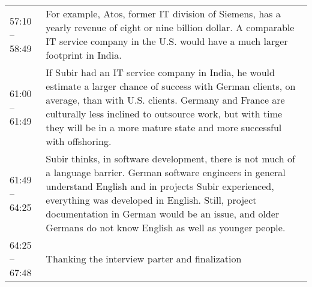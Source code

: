 \begin{appendix}
\begin{longtable}{l p{12.5cm}}
	57:10 -- 58:49&For example, Atos, former IT division of Siemens, has a yearly revenue of eight or nine billion dollar. A comparable IT service company in the U.S. would have a much larger footprint in India.\\
	61:00 -- 61:49&If Subir had an IT service company in India, he would estimate a larger chance of success with German clients, on average, than with U.S. clients. Germany and France are culturally less inclined to outsource work, but with time they will be in a more mature state and more successful with offshoring.\\
	61:49 -- 64:25&Subir thinks, in software development, there is not much of a language barrier. German software engineers in general understand English and in projects Subir experienced, everything was developed in English. Still, project documentation in German would be an issue, and older Germans do not know English as well as younger people.\\
	64:25 -- 67:48&Thanking the interview parter and finalization\\
\end{longtable}	
\end{appendix}	